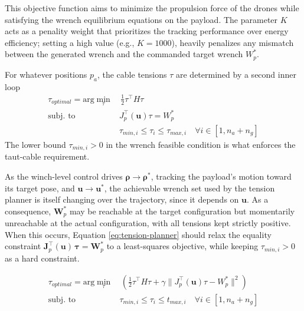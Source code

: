 This objective function aims to minimize the propulsion force of the drones while satisfying the wrench equilibrium equations on the payload. The parameter $K$ acts as a penality weight that prioritizes the tracking performance over energy efficiency; setting a high value (e.g., $K=1000$), heavily penalizes any mismatch between the generated wrench and the commanded target wrench $W_p^*$.

For whatever positions $p_a$, the cable tensions $\tau$ are determined by a second inner loop
\begin{equation}
    \begin{aligned}
    \tau_{optimal} = \text{arg} \min_\tau & \, \frac{1}{2}\tau^\top H \tau \\
    \text{subj. to} \quad 
        & J_p^\top(\mathbf{u}) \tau = W_p^* \\
        & \tau_{min, i} \le \tau_i \le \tau_{max, i} \quad \forall i \in [1, n_a+ n_g]
    \end{aligned}
    \label{eq:tension-planner}
\end{equation}
The lower bound $\tau_{min, i}>0$ in the wrench feasible condition is what enforces the taut-cable requirement.

As the winch-level control drives $\mathbf{\rho} \to \mathbf{\rho}^*$, tracking the payload's motion toward its target pose, and $\mathbf{u} \to \mathbf{u}^*$, the achievable wrench set used by the tension planner is itself changing over the trajectory, since it depends on $\mathbf{u}$. As a consequence, $\mathbf{W}_p^*$ may be reachable at the target configuration but momentarily unreachable at the actual configuration, with all tensions kept strictly positive. When this occurs, Equation \ref{eq:tension-planner} should relax the equality constraint $\mathbf{J}_p^\top(\mathbf{u})\,\mathbf{\tau} = \mathbf{W}_p^*$ to a least-squares objective, while keeping $\tau_{min,i} > 0$ as a hard constraint. 

\begin{equation}
        \begin{aligned}
    \tau_{optimal} = \text{arg} \min_\tau & \, \left(\frac{1}{2}\tau^\top H \tau +\gamma \| J_p^\top (\mathbf{u}) \tau - W_p^*\|^2\right) \\
    \text{subj. to} \quad 
        & \tau_{min, i} \le \tau_i \le t_{max, i} \quad \forall i \in [1, n_a+ n_g]
    \end{aligned}
    \label{eq:tension-planner-relax}
\end{equation}


